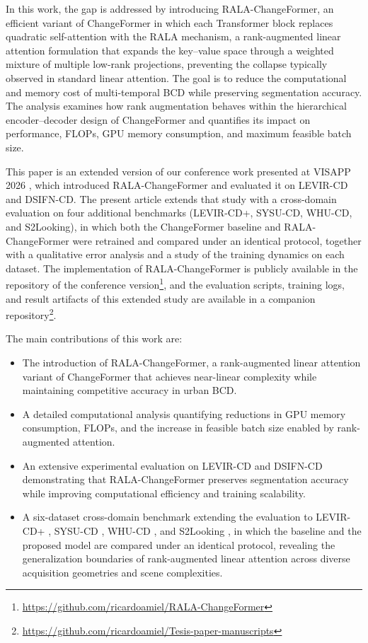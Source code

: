 \documentclass[runningheads]{llncs}
\newcommand{\journal}[1]{{\color{orange}#1}}
\begin{document}
In this work, the gap is addressed by introducing RALA-ChangeFormer,
an efficient variant of ChangeFormer in which each Transformer block replaces
quadratic self-attention with the RALA mechanism, a rank-augmented linear
attention formulation that expands the key–value space through a weighted
mixture of multiple low-rank projections, preventing the collapse typically
observed in standard linear attention. The goal is to reduce the computational
and memory cost of multi-temporal BCD while preserving segmentation accuracy.
The analysis examines how rank augmentation behaves within the hierarchical
encoder–decoder design of ChangeFormer and quantifies its impact on
performance, FLOPs, GPU memory consumption, and maximum feasible batch size.

\journal{This paper is an extended version of our conference work presented at
VISAPP 2026 \cite{acuna2026efficient}, which introduced RALA-ChangeFormer and
evaluated it on LEVIR-CD and DSIFN-CD. The present article extends that study
with a cross-domain evaluation on four additional benchmarks (LEVIR-CD+,
SYSU-CD, WHU-CD, and S2Looking), in which both the ChangeFormer baseline and
RALA-ChangeFormer were retrained and compared under an identical protocol,
together with a qualitative error analysis and a study of the training
dynamics on each dataset.
The implementation of RALA-ChangeFormer is publicly available in the
repository of the conference
version\footnote{\url{https://github.com/ricardoamiel/RALA-ChangeFormer}},
and the evaluation scripts, training logs, and result artifacts of this
extended study are available in a companion
repository\footnote{\url{https://github.com/ricardoamiel/Tesis-paper-manuscripts}}.}

The main contributions of this work are:
\begin{itemize}
    \item The introduction of RALA-ChangeFormer, a rank-augmented
          linear attention variant of ChangeFormer that achieves near-linear
          complexity while maintaining competitive accuracy in urban BCD.
    \item A detailed computational analysis quantifying reductions
          in GPU memory consumption, FLOPs, and the increase in feasible batch
          size enabled by rank-augmented attention.
    \item An extensive experimental evaluation on LEVIR-CD and
          DSIFN-CD demonstrating that RALA-ChangeFormer preserves segmentation
          accuracy while improving computational efficiency and training
          scalability.
    \item \journal{A six-dataset cross-domain benchmark extending the evaluation to LEVIR-CD+ \cite{Zheng2020LEVIR}, SYSU-CD \cite{ShiSYSU2022}, WHU-CD \cite{Ji2019WHU}, and S2Looking \cite{ShenS2Looking2021}, in which the baseline and the proposed model are compared under an identical protocol, revealing the generalization boundaries of rank-augmented linear attention across diverse acquisition geometries and scene complexities.}
\end{itemize}
\end{document}
